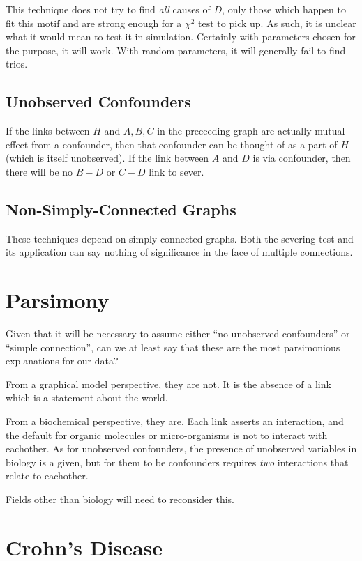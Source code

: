 \documentclass[twocolumn,12pt]{article}
\begin{document}
This technique does not try to find \textit{all} causes of $D$, only
those which happen to fit this motif and are strong enough for a
$\chi^2$ test to pick up.  As such, it is unclear what it would mean
to test it in simulation.  Certainly with parameters chosen for the
purpose, it will work.  With random parameters, it will generally fail
to find trios.

\subsection{Unobserved Confounders}

If the links between $H$ and $A,B,C$ in the preceeding graph are
actually mutual effect from a confounder, then that confounder can be
thought of as a part of $H$ (which is itself unobserved).  If the link
between $A$ and $D$ is via confounder, then there will be no $B-D$ or
$C-D$ link to sever.

\subsection{Non-Simply-Connected Graphs}

These techniques depend on simply-connected graphs.  Both the severing
test and its application can say nothing of significance in the face
of multiple connections.

\section{Parsimony}

Given that it will be necessary to assume either ``no unobserved
confounders'' or ``simple connection'', can we at least say that these
are the most parsimonious explanations for our data?

From a graphical model perspective, they are not.  It is the absence
of a link which is a statement about the world.

From a biochemical perspective, they are.  Each link asserts an
interaction, and the default for organic molecules or micro-organisms
is not to interact with eachother.  As for unobserved confounders, the
presence of unobserved variables in biology is a given, but for them
to be confounders requires \textit{two} interactions that relate to
eachother.

Fields other than biology will need to reconsider this.

\section{Crohn's Disease}
\end{document}
